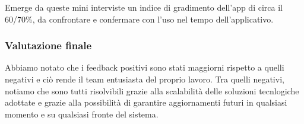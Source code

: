 \begin{flushleft}
            \vspace{0.2cm}
            Emerge da queste mini interviste un indice di gradimento dell'app di circa il 60/70\%, da confrontare e confermare con l'uso nel tempo dell'applicativo.



        \end{flushleft}

    \subsubsection{Valutazione finale}
        \begin{flushleft}
            Abbiamo notato che i feedback positivi sono stati maggiorni rispetto a quelli negativi e ciò rende il team entusiasta del proprio lavoro. Tra quelli negativi, notiamo che sono tutti risolvibili grazie alla scalabilità delle soluzioni tecnlogiche adottate e grazie alla possibilità di garantire aggiornamenti futuri in qualsiasi momento e su qualsiasi fronte del sistema.
        \end{flushleft}